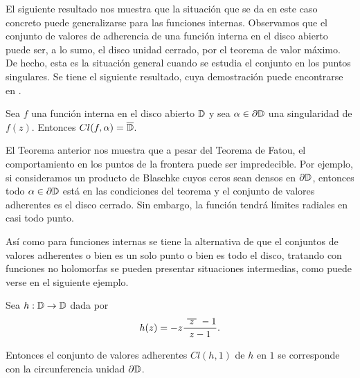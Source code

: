 
El siguiente resultado nos muestra que la situación que se da en este caso concreto puede generalizarse para las funciones internas. Observamos que el conjunto de valores de adherencia de una función interna en el disco abierto puede ser, a lo sumo, el disco unidad cerrado, por el teorema de valor máximo. De hecho, esta es la situación general cuando se estudia el conjunto en los puntos singulares. Se tiene el siguiente resultado, cuya demostración puede encontrarse en \citet[chap. 6]{garnett1981bounded}. \\

\begin{theorem}
    Sea $f$ una función interna en el disco abierto $\mathbb{D}$ y sea $\alpha \in \partial \mathbb{D}$ una singularidad de $f(z)$. Entonces $Cl(f, \alpha) = \overline{\mathbb{D}}$.
\end{theorem}

El Teorema anterior nos muestra que a pesar del Teorema de Fatou, el comportamiento en los puntos de la frontera puede ser impredecible. Por ejemplo, si consideramos un producto de Blaschke cuyos ceros sean densos en $\partial \mathbb{D}$, entonces todo $\alpha \in \partial \mathbb{D}$ está en las condiciones del teorema y el conjunto de valores adherentes es el disco cerrado. Sin embargo, la función tendrá límites radiales en casi todo punto. \\


Así como para funciones internas se tiene la alternativa de que el conjuntos de valores adherentes o bien es un solo punto o bien es todo el disco, tratando con funciones no holomorfas se pueden presentar situaciones intermedias, como puede verse en el siguiente ejemplo. \\

\begin{example}
    Sea $h: \mathbb{D} \to \mathbb{D}$ dada por
    \begin{equation*}
        h(z) = -z \frac{\xbar{z} -1}{z - 1}.
    \end{equation*}

    Entonces el conjunto de valores adherentes $Cl(h,1)$ de $h$ en $1$ se corresponde con la circunferencia unidad $\partial \mathbb{D}$.
\end{example}

